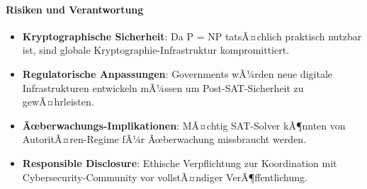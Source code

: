 ﻿\documentclass[a4paper,12pt]{article}
\theoremstyle{definition}
\begin{document}
\paragraph{Risiken und Verantwortung}

\begin{itemize}
	\item \textbf{Kryptographische Sicherheit}: Da P = NP tatsÃ¤chlich praktisch nutzbar ist, sind globale Kryptographie-Infrastruktur kompromittiert.
	
	\item \textbf{Regulatorische Anpassungen}: Governments wÃ¼rden neue digitale Infrastrukturen entwickeln mÃ¼ssen um Post-SAT-Sicherheit zu gewÃ¤hrleisten.
	
	\item \textbf{Ãœberwachungs-Implikationen}: MÃ¤chtig SAT-Solver kÃ¶nnten von AutoritÃ¤ren-Regime fÃ¼r Ãœberwachung missbraucht werden.
	
	\item \textbf{Responsible Disclosure}: Ethische Verpflichtung zur Koordination mit Cybersecurity-Community vor vollstÃ¤ndiger VerÃ¶ffentlichung.
\end{itemize}

\end{document}
